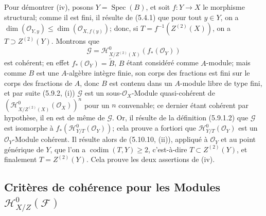 \documentclass[10pt,oneside]{book}
\newcommand{\oldpage}[2][]{%
  \setcounter{footnote}{0}%
  \marginpar{\scriptsize\textbf{#1}~|~#2}\ignorespaces}
\begin{document}
Pour démontrer (iv), posons $Y=\operatorname{Spec}(B)$, et soit $f:Y\to X$ le
morphisme structural; comme il est fini, il résulte de (5.4.1) que pour tout
$y\in Y$, on a
$\dim(\mathcal O_{Y,y})\leq\dim(\mathcal O_{X,f(y)})$; donc, si
$T=f^{-1}(Z^{(2)}(X))$, on a $T\supset Z^{(2)}(Y)$. Montrons que
\[
\mathcal G=\mathcal H^0_{X/Z^{(2)}(X)}(f_*(\mathcal O_Y))
\]
est cohérent; en effet $f_*(\mathcal O_Y)=\widetilde B$, $B$ étant considéré
comme $A$-module; mais comme $B$ est une $A$-algèbre intègre finie, son corps
des fractions est fini sur le corps des fractions de $A$, donc $B$ est contenu
dans un $A$-module libre de type fini, et par suite (5.9.2, (i)) $\mathcal G$
est un sous-$\mathcal O_X$-Module quasi-cohérent de
$(\mathcal H^0_{X/Z^{(2)}(X)}(\mathcal O_X))^n$ pour un $n$ convenable; ce
dernier étant cohérent par hypothèse, il en est de même de $\mathcal G$. Or,
il résulte de la définition (5.9.1.2) que $\mathcal G$ est isomorphe à
$f_*(\mathcal H^0_{Y/T}(\mathcal O_Y))$; cela prouve a fortiori que
$\mathcal H^0_{Y/T}(\mathcal O_Y)$ est un $\mathcal O_Y$-Module cohérent. Il
résulte alors de (5.10.10, (ii)), appliqué à $\mathcal O_Y$ et au point
générique de $Y$, que l'on a $\operatorname{codim}(T,Y)\geq2$, c'est-à-dire
$T\subset Z^{(2)}(Y)$, et finalement $T=Z^{(2)}(Y)$. Cela prouve les deux
assertions de (iv).

\oldpage[IV-2]{122}

\subsection{\texorpdfstring{Critères de cohérence pour les Modules
$\mathcal H^0_{X/Z}(\mathcal F)$}{Critères de cohérence pour les Modules H\string^0\string_(F)}}
\end{document}
